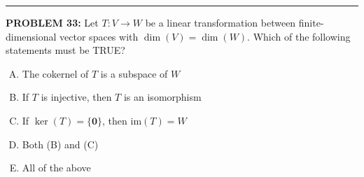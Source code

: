 \documentclass[12pt]{amsart}
\newcommand{\divider}{
  \vspace{-1em} %
  \noindent
  \raisebox{-0.15ex}{\textbullet}%
  \hspace{0.5em}%
  \rule[0.5ex]{0.95\textwidth}{1.0pt}%
  \hspace{0.5em}%
  \raisebox{-0.15ex}{\textbullet}%
  \vspace{0em} %
}
\begin{document}
%
%
%
%
%
%

\divider

{\bf PROBLEM 33:}
%
Let $T: V \to W$ be a linear transformation between finite-dimensional 
vector spaces with $\dim(V) = \dim(W)$. Which of the following statements 
must be TRUE?

\begin{enumerate}[(A)]
\item The cokernel of $T$ is a subspace of $W$
\item If $T$ is injective, then $T$ is an isomorphism
\item If $\ker(T) = \{\mathbf{0}\}$, then $\mathrm{im}(T) = W$
\item Both (B) and (C)
\item All of the above
\end{enumerate}
\end{document}
